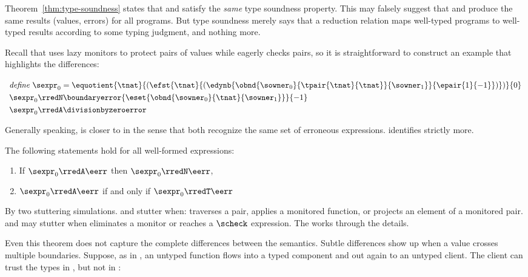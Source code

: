 Theorem~\ref{thm:type-soundness} states that \Nname{} and \Aname{} satisfy
the {\em same\/} type soundness property. This may falsely suggest that
\Nname{} and \Aname{} produce the same results (values, errors) for all
programs. But type soundness merely says that a reduction relation maps
well-typed programs to well-typed results according to some typing judgment,
and nothing more.

Recall that \Aname{} uses lazy monitors to protect pairs of values while
\Nname{} eagerly checks pairs, so it is straightforward to construct an
example that highlights the differences: 

\medskip
\(\begin{array}[t]{l}
  \mbox{\it define~}
      \sexpr_0 = \equotient{\tnat}{
                    (\efst{\tnat}{(\edynb{\obnd{\sowner_0}{\tpair{\tnat}{\tnat}}{\sowner_1}}{\epair{1}{{-1}}})})}{0}
  \\[0.8ex]
      \sexpr_0 \rredN \boundaryerror{\eset{\obnd{\sowner_0}{\tnat}{\sowner_1}}}{{-1}}
  \\[0.8ex]
    \sexpr_0 \rredA \divisionbyzeroerror
\end{array}\)
\smallskip

\noindent Generally speaking, \Aname{} is closer to \Tname{} in the sense
that both recognize the same set of erroneous expressions. \Nname{}
identifies strictly more.

\begin{theorem}
  The following statements hold for all well-formed expressions:
  \begin{enumerate}
    \itemsep0.5ex
    \item
      If\/
      $\sexpr_0 \rredA \eerr$
      then\/
      $\sexpr_0 \rredN \eerr$,
    \item
      $\sexpr_0 \rredA \eerr$
      if and only if\/
      $\sexpr_0 \rredT \eerr$
  \end{enumerate}
\end{theorem}
\begin{proofsketch}
  By two stuttering simulations.
  \Nname{} and \Aname{} stutter when: \Nname{} traverses a pair,
   \Nname{} applies a monitored function,
   or \Aname{} projects an element of a monitored pair.
  \Aname{} and \Tname{} may stutter when \Aname{} eliminates a monitor or
   \Tname{} reaches a $\scheck$ expression.
  The \techreport{} works through the details.
\end{proofsketch}

Even this theorem does not capture the complete differences between the
semantics. Subtle differences show up when a value crosses multiple
boundaries.  Suppose, as in , an untyped function
flows into a typed component and out again to an untyped client.  The
client can trust the types in \Nname{}, but not in \Aname{}:

